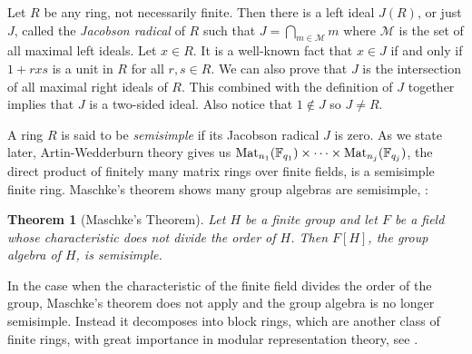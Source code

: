\documentclass[11pt,reqno]{amsart}
\newtheorem{thm}{Theorem}[section]
\begin{document}
Let $R$ be any ring, not necessarily finite. Then there is a left ideal $J(R)$, or just $J$, called the \emph{Jacobson radical} of $R$ such that $J=\bigcap\limits_{m \in \mathcal{M}}m$ where $\mathcal{M}$ is the set of all maximal left ideals. Let $x \in R$. It is a well-known fact that $x \in J$ if and only if $1+rxs$ is a unit in $R$ for all $r,s \in R$. We can also prove that $J$ is the intersection of all maximal right ideals of $R$. This combined with the definition of $J$  together implies that $J$ is a two-sided ideal. Also notice that $1 \notin J$ so $J \neq R$. 

A ring $R$ is said to be \emph{semisimple} if its Jacobson radical $J$ is zero. As we state later, Artin-Wedderburn theory gives us $\operatorname{Mat}_{n_1}(\Bbb F_{q_1}) \times \cdots \times \operatorname{Mat}_{n_j}(\Bbb F_{q_j})$, the direct product of finitely many matrix rings over finite fields, is a semisimple finite ring. Maschke's theorem shows many group algebras are semisimple, \cite{Curtis}:

\begin{thm}[Maschke's Theorem] \label{MT} 
Let $H$ be a finite group and let $F$ be a field whose characteristic does not divide the order of $H$. Then $F[H]$, the group algebra of $H$, is semisimple.
\end{thm}

In the case when the characteristic of the finite field divides the order of the group, Maschke's theorem does not apply and the group algebra is no longer semisimple. Instead it decomposes into block rings, which are another class of finite rings, with great importance in modular representation theory, see \cite{Alperin}.
\end{document}
